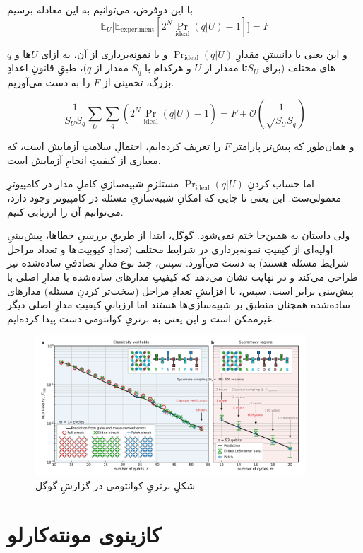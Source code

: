 \documentclass[11pt]{article}
\begin{document}
با این دوفرض، می‌توانیم به این معادله برسیم
\[ \mathbb{E}_U\Big[\mathbb{E}_\text{experiment}[2^N \Pr_\text{ideal}(q | U) - 1]\Big] = F \]


و این یعنی با دانستنِ مقدارِ 
$\Pr_\text{ideal}(q|U)$
و با نمونه‌برداری از آن، به ازای $U$ها و $q$های مختلف (برای $S_U$تا مقدار از $U$ و هرکدام با $S_q$ مقدار از $q$)، طبقِ قانونِ اعدادِ بزرگ، تخمینی از $F$ را به دست می‌آوریم.

\[ \frac{1}{S_U S_q} \sum_U \sum_q (2^N \Pr_{\text{ideal}}(q |U) - 1) = F + \mathcal{O}(\frac{1}{\sqrt{S_U S_q}}) \]

و همان‌طور که پیش‌تر پارامتر $F$ را تعریف کرده‌ایم، احتمالِ سلامتِ آزمایش است، که معیاری از کیفیتِ انجامِ آزمایش است.

اما حساب کردنِ $\Pr_\text{ideal}(q|U)$ مستلزمِ شبیه‌سازیِ کاملِ مدار در کامپیوترِ معمولی‌ست. این یعنی تا جایی که امکانِ شبیه‌سازیِ مسئله در کامپیوتر وجود دارد، می‌توانیم آن را ارزیابی کنیم.

ولی داستان به همین‌جا ختم نمی‌شود. گوگل، ابتدا از طریقِ بررسیِ خطاها، پیش‌بینیِ اولیه‌ای از کیفیتِ نمونه‌برداری در شرایط مختلف (تعدادِ کیوبیت‌ها و تعداد مراحل شرایط مسئله هستند) به دست می‌آورد. سپس، چند نوع مدارِ تصادفیِ ساده‌شده نیز طراحی می‌کند و در نهایت نشان می‌دهد که کیفیتِ مدارهای ساده‌شده با مدارِ اصلی با پیش‌بینی‌ برابر است. سپس، با افزایشِ تعدادِ مراحل (سخت‌تر کردنِ مسئله) مدارهای ساده‌شده همچنان منطبق بر شبیه‌سازی‌‌ها هستند اما ارزیابیِ کیفیتِ مدارِ اصلی دیگر غیرممکن است و این یعنی به برتریِ کوانتومی دست پیدا کرده‌ایم. \cite{google}

\begin{figure}[H]
\centering
\includegraphics[width=0.9\textwidth]{res/google_supremacy.png}
\caption{شکلِ برتریِ کوانتومی در گزارشِ گوگل \cite{google}}
\end{figure}

\section{کازینوی مونته‌کارلو}
\end{document}
